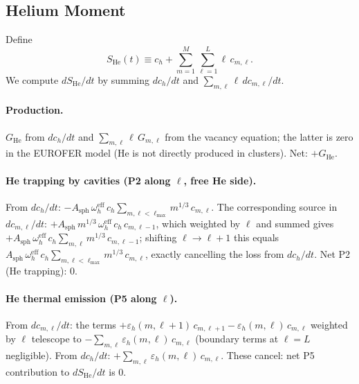 \subsection{Helium Moment}
\label{app:He}

Define
\begin{equation}
    S_{\mathrm{He}}(t)
    \equiv c_h + \sum_{m=1}^{M}\sum_{\ell=1}^{L}\ell\,c_{m,\ell}.
\end{equation}
We compute $dS_{\mathrm{He}}/dt$ by summing $dc_h/dt$ and
$\sum_{m,\ell}\ell\,dc_{m,\ell}/dt$.

\paragraph{Production.}
$G_{\mathrm{He}}$ from $dc_h/dt$ and $\sum_{m,\ell}\ell\,G_{m,\ell}$ from
the vacancy equation; the latter is zero in the EUROFER model (He is not
directly produced in clusters). Net: $+G_{\mathrm{He}}$.

\paragraph{He trapping by cavities (P2 along $\ell$, free He side).}
From $dc_h/dt$: $-A_{\mathrm{sph}}\,\omega_h^{\mathrm{eff}}\,c_h
\sum_{m,\ell<\ell_{\max}}m^{1/3}\,c_{m,\ell}$.
The corresponding source in $dc_{m,\ell}/dt$: $+A_{\mathrm{sph}}\,m^{1/3}
\,\omega_h^{\mathrm{eff}}\,c_h\,c_{m,\ell-1}$, which weighted by $\ell$ and
summed gives $+A_{\mathrm{sph}}\,\omega_h^{\mathrm{eff}}\,c_h\sum_{m,\ell}
m^{1/3}\,c_{m,\ell-1}$; shifting $\ell \to \ell+1$ this equals
$A_{\mathrm{sph}}\,\omega_h^{\mathrm{eff}}\,c_h\sum_{m,\ell < \ell_{\max}}
m^{1/3}\,c_{m,\ell}$, exactly cancelling the loss from $dc_h/dt$. Net P2
(He trapping): $0$. \checkmark

\paragraph{He thermal emission (P5 along $\ell$).}
From $dc_{m,\ell}/dt$: the terms $+\varepsilon_h(m,\ell{+}1)\,c_{m,\ell+1}
- \varepsilon_h(m,\ell)\,c_{m,\ell}$ weighted by $\ell$ telescope to
$-\sum_{m,\ell}\varepsilon_h(m,\ell)\,c_{m,\ell}$ (boundary terms at
$\ell=L$ negligible). From $dc_h/dt$: $+\sum_{m,\ell}\varepsilon_h(m,\ell)
\,c_{m,\ell}$. These cancel: net P5 contribution to $dS_{\mathrm{He}}/dt$
is $0$. \checkmark

